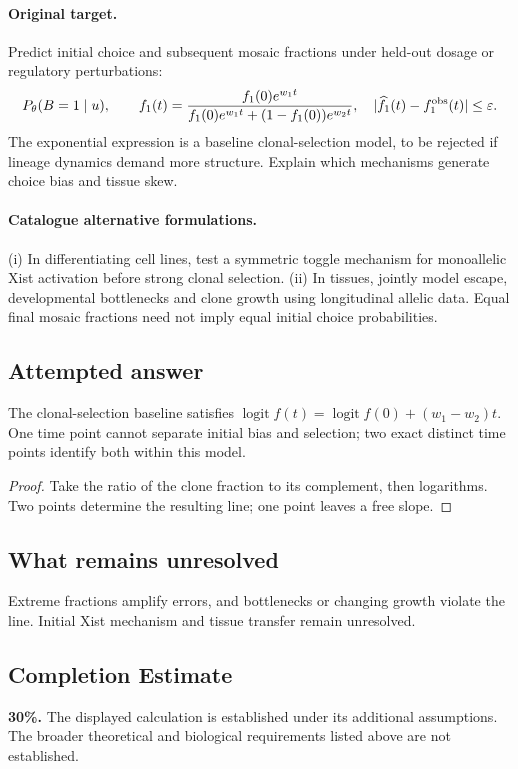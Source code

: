 \documentclass[11pt]{article}
\begin{document}
\paragraph{Original target.}
Predict initial choice and subsequent mosaic fractions under held-out dosage or regulatory perturbations:
\[
P_\theta(B=1\mid u),\qquad
f_1(t)=\frac{f_1(0)e^{w_1t}}{f_1(0)e^{w_1t}+(1-f_1(0))e^{w_2t}},
\quad |\widehat f_1(t)-f_1^{\rm obs}(t)|\leq\varepsilon.
\]
The exponential expression is a baseline clonal-selection model, to be rejected if lineage dynamics demand more structure. Explain which mechanisms generate choice bias and tissue skew.
\paragraph{Catalogue alternative formulations.}
(i) In differentiating cell lines, test a symmetric toggle mechanism for monoallelic Xist activation before strong clonal selection. (ii) In tissues, jointly model escape, developmental bottlenecks and clone growth using longitudinal allelic data. Equal final mosaic fractions need not imply equal initial choice probabilities.
\subsection{Attempted answer}
\begin{proposition}
The clonal-selection baseline satisfies $\operatorname{logit}f(t)=\operatorname{logit}f(0)+(w_1-w_2)t$. One time point cannot separate initial bias and selection; two exact distinct time points identify both within this model.
\end{proposition}
\begin{proof}
Take the ratio of the clone fraction to its complement, then logarithms. Two points determine the resulting line; one point leaves a free slope.
\end{proof}
\subsection{What remains unresolved}
Extreme fractions amplify errors, and bottlenecks or changing growth violate the line. Initial Xist mechanism and tissue transfer remain unresolved.
\subsection{Completion Estimate}
\textbf{30\%.} The displayed calculation is established under its additional assumptions. The broader theoretical and biological requirements listed above are not established.
\end{document}
